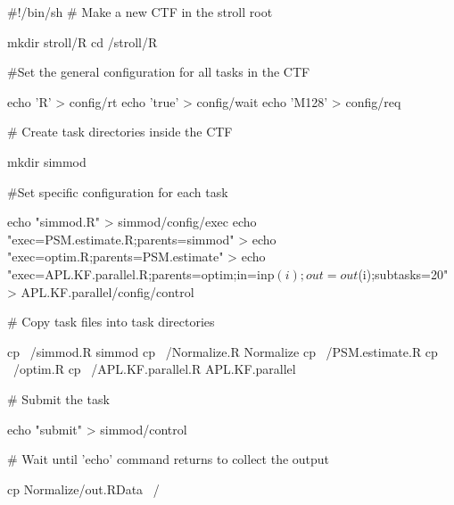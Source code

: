 #!/bin/sh
# Make a new CTF in the stroll root

mkdir stroll/R
cd /stroll/R

#Set the general configuration for all tasks in the CTF

echo 'R' > config/rt
echo 'true' > config/wait
echo 'M128' > config/req

# Create task directories inside the CTF

mkdir simmod %

#Set specific configuration for each task

echo "simmod.R" > simmod/config/exec
echo "exec=PSM.estimate.R;parents=simmod" > 
echo "exec=optim.R;parents=PSM.estimate" >
echo "exec=APL.KF.parallel.R;parents=optim;in=inp$(i);
out=out$(i);subtasks=20" > APL.KF.parallel/config/control

# Copy task files into task directories

cp ~/simmod.R simmod
cp ~/Normalize.R Normalize
cp ~/PSM.estimate.R %
cp ~/optim.R %
cp ~/APL.KF.parallel.R APL.KF.parallel

# Submit the task

echo "submit" > simmod/control

# Wait until 'echo' command returns to collect the output

cp Normalize/out.RData ~/

